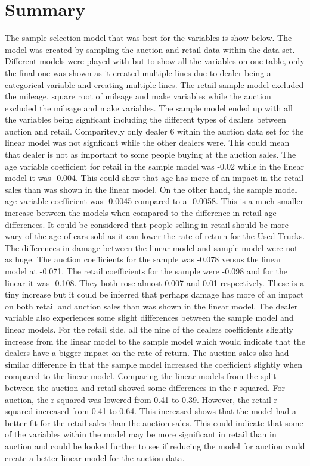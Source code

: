 \documentclass[11pt]{paper}
\begin{document}
\section{Summary}
The sample selection model that was best for the variables is show below. The
model was created by sampling the auction and retail data within the data set.
Different models were played with but to show all the variables on one table,
only the final one was shown as it created multiple lines due to dealer being
a categorical variable and creating multiple lines. The retail sample model excluded the mileage, square root of mileage and make variables while the auction
excluded the mileage and make variables.
The sample model ended up with all the variables being signficant including the
different types of dealers between auction and retail. Comparitevly only dealer
6 within the auction data set for the linear model was not signficant while the
other dealers were. This could mean that dealer is not as important to some
people buying at the auction sales. The age variable coefficient for retail in
the sample model was -0.02 while in the linear model it was -0.004. This could
show that age has more of an impact in the retail sales than was shown in the
linear model. On the other hand, the sample model age variable coefficient was
-0.0045 compared to a -0.0058. This is a much smaller increase between the
models when compared to the difference in retail age differences. It could be
considered that people selling in retail should be more wary of the age of cars
sold as it can lower the rate of return for the Used Trucks.
The differences in damage between the linear model and sample model were not
as huge. The auction coefficients for the sample was -0.078 versus the linear
model at -0.071. The retail coefficients for the sample were -0.098 and for the
linear it was -0.108. They both rose almost 0.007 and 0.01 respectively. These
is a tiny increase but it could be inferred that perhaps damage has more of an
impact on both retail and auction sales than was shown in the linear model.
The dealer variable also experiences some slight differences between the sample model and linear models. For the retail side, all the nine of the dealers
coefficients slightly increase from the linear model to the sample model which
would indicate that the dealers have a bigger impact on the rate of return. The
auction sales also had similar difference in that the sample model increased the
coefficient slightly when compared to the linear model.
Comparing the linear models from the split between the auction and retail
showed some differences in the r-squared. For auction, the r-squared was lowered from 0.41 to 0.39. However, the retail r-squared increased from 0.41 to 0.64.
This increased shows that the model had a better fit for the retail sales than the
auction sales. This could indicate that some of the variables within the model
may be more significant in retail than in auction and could be looked further to
see if reducing the model for auction could create a better linear model for the
auction data.
\clearpage


\end{document}
